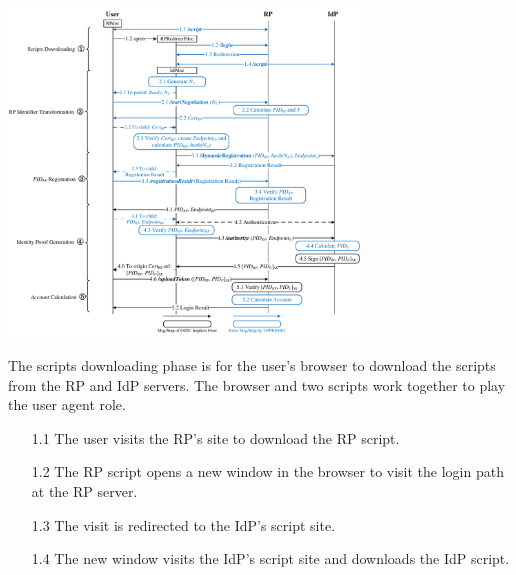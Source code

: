 \begin{strip}
\centering\includegraphics[width=0.7\textwidth]{fig/process-js.pdf}
\label{fig:process}
\vspace{-5mm}
\end{strip}



The scripts downloading phase is for the user's browser to download the scripts from the RP and IdP servers. The browser and two scripts work together to play the user agent role.
\vspace{-\topsep}
\begin{itemize}
\item[1.1] The user visits the RP's site to download the RP script.
\vspace{-\topsep}
\item[1.2] The RP script opens a new window in the browser to visit the login path at the RP server.
\vspace{-\topsep}
\item[1.3] The visit is redirected to the IdP's script site.
\vspace{-\topsep}
\item[1.4] The new window visits the IdP's script site and downloads the IdP script.
\end{itemize}
\vspace{-\topsep}

